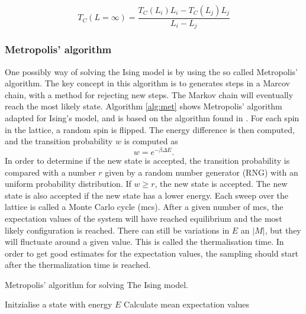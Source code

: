 \begin{equation}
T_C(L=\infty) = \frac{T_C(L_i)L_i-T_C(L_j)L_j}{L_i-L_j}
\end{equation}

\subsubsection{Metropolis' algorithm}
One possibly way of solving the Ising model is by using the so called Metropolis' algorithm. The key concept in this algorithm is to generates steps in a Marcov chain, with a method for rejecting new steps. The Markov chain will eventually reach the most likely state. Algorithm \ref{alg:met} shows Metropolis' algorithm adapted for Ising's model, and is based on the algorithm found in \cite{lecturenotes}. For each spin in the lattice, a random spin is flipped. The energy difference is then computed, and the transition probability $w$ is computed as
\begin{equation}
w=e^{- \beta \Delta E }.
\end{equation}
In order to determine if the new state is accepted, the transition probability
is compared with a number $r$ given by a random number generator (RNG) with an uniform probability distribution. If $w \geq r$, the new state is accepted. The new state is also accepted if the new state has a lower energy. Each sweep over the lattice is called a Monte Carlo cycle (mcs). After a given number of mcs, the expectation values of the system will have reached equilibrium and the most likely configuration is reached. There can still be variations in $E$ an $|M|$, but they will fluctuate around a given value. This is called the thermalisation time. In order to get good estimates for the expectation values, the sampling should start after the thermalization time is reached. 


\begin{algorithm}[htbp]\label{alg:met}\caption{Metropolis' algorithm for solving The Ising model.}
	\SetAlgoLined
	\BlankLine
	\BlankLine
	Initzialise a state with energy $E$\;
	Calculate mean expectation values\;	
	\BlankLine
	\BlankLine
\end{algorithm}

